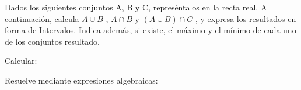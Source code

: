 \documentclass[addpoints,spanish, 12pt,a4paper]{exam}
\begin{document}
        \begin{questions}
        \question Dados los siguientes conjuntos A, B y C, represéntalos en la recta real. A continuación, calcula $A \cup  B$ , $A \cap B$ y $(A \cup B) \cap C$ , 
y expresa los resultados en forma de Intervalos. 
Indica además, si existe, el máximo y el mínimo de cada uno de los conjuntos resultado.
        \begin{multicols}{1}
        \begin{parts} \part[1]  $ A=\left\{ x \in \mathbb{R}| 6 \leq x \wedge x < 8 \right\}, \\ B=\left(-\infty, -3\right) \cup \left(3, \infty\right)  y \\  C=\left\{ x \in \mathbb{R}| \left|{x - 3}\right|\leq12 \right\} \\ $  \begin{solution}  $ C=\left[-9, 15\right] \ \ A \cup  B = \left(-\infty, -3\right) \cup \left(3, \infty\right)  \\  A \cap B= \left[6, 8\right)   \\  (A \cup B) \cap C= \left[-9, -3\right) \cup \left(3, 15\right] $  \end{solution}
        \end{parts}
        \end{multicols}
        \question Calcular:
        \begin{multicols}{1}
        \end{multicols}
        \question Resuelve mediante expresiones algebraicas:

\end{questions}
\end{document}
